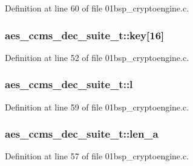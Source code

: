 Definition at line 60 of file 01bsp\+\_\+cryptoengine.\+c.

\subsubsection[{\texorpdfstring{key}{key}}]{ aes\+\_\+ccms\+\_\+dec\+\_\+suite\+\_\+t\+::key\mbox{[}16\mbox{]}}\hypertarget{structaes__ccms__dec__suite__t_a543c86703b6f70924f4711e9c078abf7}{}\label{structaes__ccms__dec__suite__t_a543c86703b6f70924f4711e9c078abf7}


Definition at line 52 of file 01bsp\+\_\+cryptoengine.\+c.

\subsubsection[{\texorpdfstring{l}{l}}]{ aes\+\_\+ccms\+\_\+dec\+\_\+suite\+\_\+t\+::l}\hypertarget{structaes__ccms__dec__suite__t_a4c1498e0740b07d86716c2428e08fdba}{}\label{structaes__ccms__dec__suite__t_a4c1498e0740b07d86716c2428e08fdba}


Definition at line 59 of file 01bsp\+\_\+cryptoengine.\+c.

\subsubsection[{\texorpdfstring{len\+\_\+a}{len_a}}]{ aes\+\_\+ccms\+\_\+dec\+\_\+suite\+\_\+t\+::len\+\_\+a}\hypertarget{structaes__ccms__dec__suite__t_a9a4ebf02e9dc1c6180f64cd72d108bd5}{}\label{structaes__ccms__dec__suite__t_a9a4ebf02e9dc1c6180f64cd72d108bd5}


Definition at line 57 of file 01bsp\+\_\+cryptoengine.\+c.

